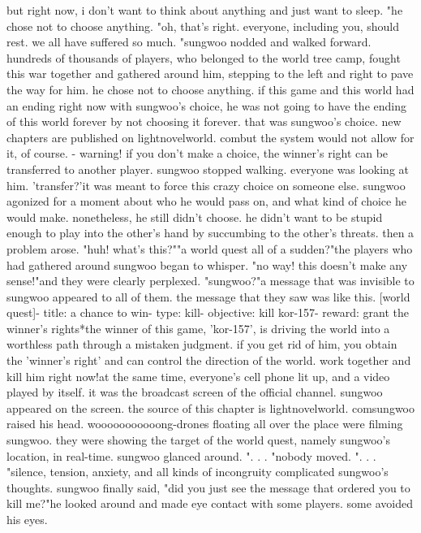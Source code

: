 but right now, i don't want to think about anything and just want to sleep.
"he chose not to choose anything.
"oh, that's right.
 everyone, including you, should rest.
 we all have suffered so much.
"sungwoo nodded and walked forward.
hundreds of thousands of players, who belonged to the world tree camp, fought this war together and gathered around him, stepping to the left and right to pave the way for him.
he chose not to choose anything.
 if this game and this world had an ending right now with sungwoo's choice, he was not going to have the ending of this world forever by not choosing it forever.
 that was sungwoo's choice.
new chapters are published on lightnovelworld.
combut the system would not allow for it, of course.
- warning! if you don't make a choice, the winner's right can be transferred to another player.
 sungwoo stopped walking.
 everyone was looking at him.
'transfer?'it was meant to force this crazy choice on someone else.
sungwoo agonized for a moment about who he would pass on, and what kind of choice he would make.
 nonetheless, he still didn't choose.
he didn't want to be stupid enough to play into the other's hand by succumbing to the other's threats.
then a problem arose.
"huh! what's this?""a world quest all of a sudden?"the players who had gathered around sungwoo began to whisper.
 "no way! this doesn't make any sense!"and they were clearly perplexed.
"sungwoo?"a message that was invisible to sungwoo appeared to all of them.
the message that they saw was like this.
 [world quest]- title: a chance to win- type: kill- objective: kill kor-157- reward: grant the winner's rights*the winner of this game, 'kor-157', is driving the world into a worthless path through a mistaken judgment.
 if you get rid of him, you obtain the 'winner's right' and can control the direction of the world.
 work together and kill him right now!at the same time, everyone's cell phone lit up, and a video played by itself.
it was the broadcast screen of the official channel.
 sungwoo appeared on the screen.
the source of this chapter is lightnovelworld.
comsungwoo raised his head.
wooooooooooong-drones floating all over the place were filming sungwoo.
 they were showing the target of the world quest, namely sungwoo's location, in real-time.
sungwoo glanced around.
".
.
.
"nobody moved.
 ".
.
.
"silence, tension, anxiety, and all kinds of incongruity complicated sungwoo's thoughts.
sungwoo finally said, "did you just see the message that ordered you to kill me?"he looked around and made eye contact with some players.
 some avoided his eyes.


